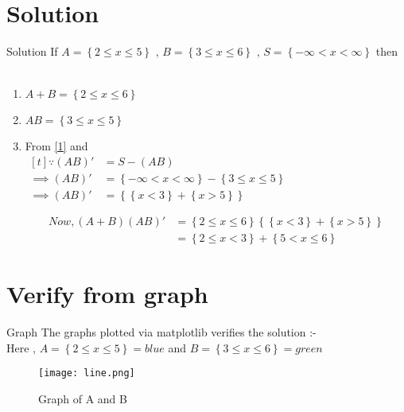 \documentclass{beamer}
\providecommand{\brak}[1]{\ensuremath{\left(#1\right)}}
\providecommand{\cbrak}[1]{\ensuremath{\left\{#1\right\}}}
\begin{document}
\section{Solution}
\begin{frame}{Solution}
    If $A = \cbrak{2 \le x \le 5}$ , $B = \cbrak{3 \le x \le 6}$ , $S = \cbrak{-\infty < x < \infty }$ then \\\\
    \begin{enumerate}
            \item $ A + B = \cbrak{2 \le x \le 6} $
            \item $ AB = \cbrak{3 \le x \le 5} $ \label{1} 
            \item  From  \eqref{1} and \\
            $\begin{aligned}[t]
           \because \brak{AB}'  &= S - \brak{AB} \\ 
              \implies  \brak{AB}' &= \cbrak{-\infty < x < \infty } - \cbrak{3 \le x \le 5} \\
             \implies \brak{AB}' &= \cbrak {\cbrak{x < 3} + \cbrak{x > 5} } \\\\
             \end{aligned} $
             \begin{align}
             Now , \brak{A + B}\brak{AB}' &= \cbrak{2 \le x \le 6} \cbrak {\cbrak{x < 3} + \cbrak{x > 5} } \\
                                          &= \cbrak{2 \le x < 3} + \cbrak{5 < x \le 6}
             \end{align} 
    \end{enumerate}
\end{frame}

\section{Verify from graph}
\begin{frame}{Graph}
The graphs  plotted via matplotlib verifies the solution :-\\
Here , $A = \cbrak{2 \le x \le 5} = blue $ and $B = \cbrak{3 \le x \le 6} = green$
\begin{figure}[!ht]
		\centering
		\texttt{[image: line.png]}
		\caption{Graph of A and B }
		\label{fig-1}
	\end{figure}
\end{frame}
\end{document}
